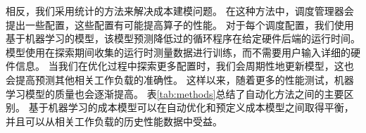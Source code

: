 相反，我们采用统计的方法来解决成本建模问题。
在这种方法中，调度管理器会提出一些配置，这些配置有可能提高算子的性能。
对于每个调度配置，我们使用基于机器学习的模型，该模型预测降低过的循环程序在给定硬件后端的运行时间。
模型使用在探索期间收集的运行时测量数据进行训练，而不需要用户输入详细的硬件信息。
当我们在优化过程中探索更多配置时，我们会周期性地更新模型，这也会提高预测其他相关工作负载的准确性。
这样以来，随着更多的性能测试，机器学习模型的质量也会逐渐提高。
表\ref{tab:methods}总结了自动化方法之间的主要区别。
基于机器学习的成本模型可以在自动优化和预定义成本模型之间取得平衡，并且可以从相关工作负载的历史性能数据中受益。



